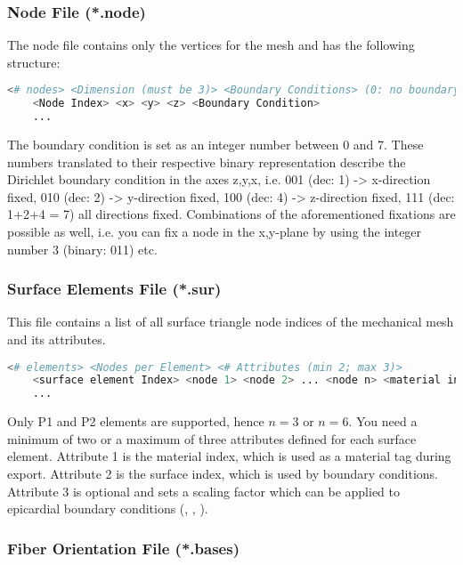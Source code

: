 \subsubsection{Node File (*.node)}
\label{nodeFile}

The node file contains only the vertices for the mesh and has the following structure:
\begin{lstlisting}[language=Bash,caption=Node File (*.node)]
    <# nodes> <Dimension (must be 3)> <Boundary Conditions> (0: no boundary condition, 1: Dirichlet)> <BoundaryMarker (must be 0)>
    <Node Index> <x> <y> <z> <Boundary Condition>
    ...
\end{lstlisting}

The boundary condition is set as an integer number between 0 and 7. 
These numbers translated to their respective binary representation describe the Dirichlet boundary condition in the axes z,y,x, i.e. 001 (dec: 1) -> x-direction fixed, 010 (dec: 2) -> y-direction fixed, 100 (dec: 4) -> z-direction fixed, 111 (dec: 1+2+4 = 7) all directions fixed. 
Combinations of the aforementioned fixations are possible as well, i.e. you can fix a node in the x,y-plane by using the integer number 3 (binary: 011) etc.

\subsubsection{Surface Elements File (*.sur)}
\label{surFile}

This file contains a list of all surface triangle node indices of the mechanical mesh and its attributes.
\begin{lstlisting}[language=Bash,caption=Surface Elements File (*.sur)]
    <# elements> <Nodes per Element> <# Attributes (min 2; max 3)>
    <surface element Index> <node 1> <node 2> ... <node n> <material index> <surface index> <surface traction scaling>
    ...
\end{lstlisting}
Only P1 and P2 elements are supported, hence $n=3$ or $n=6$.
You need a minimum of two or a maximum of three attributes defined for each surface element.
Attribute 1 is the material index, which is used as a material tag during export.
Attribute 2 is the surface index, which is used by boundary conditions. 
Attribute 3 is optional and sets a scaling factor which can be applied to epicardial boundary conditions (, , ).

\subsubsection{Fiber Orientation File (*.bases)}
\label{basesFile}

